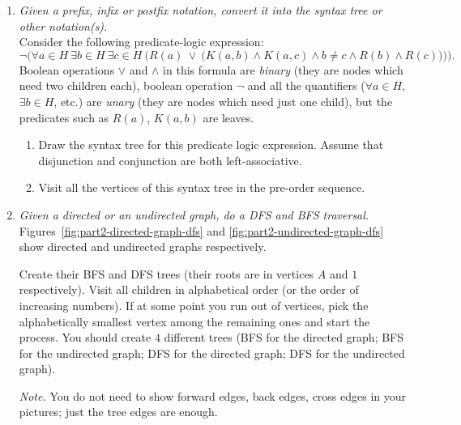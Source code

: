 \documentclass[a4paper,12pt]{article}
\begin{document}
\begin{enumerate}
\item {\small \em  Given a prefix, infix or postfix notation, convert it into the syntax tree or other notation(s).}\\
Consider the following predicate-logic expression:
\[ \neg \bigg( \forall a \in H\ \exists b \in H\ \exists c \in H\ \Big( R(a)\ \vee\  \big(K(a,b) \wedge K(a,c) \wedge b \neq c \wedge R(b) \wedge R(c)\big) \Big) \bigg). \]
Boolean operations $\vee$ and $\wedge$ in this formula are {\em binary} (they
are nodes which need two children each),
boolean operation $\neg$ and all the quantifiers ($\forall a \in H$, $\exists b \in H$, etc.) are {\em unary} (they are nodes which need just one child),
but the predicates such as $R(a)$, $K(a,b)$ are leaves.

\begin{enumerate}
\item Draw the syntax tree for this predicate logic expression. Assume that disjunction and conjunction are both left-associative.
\item Visit all the vertices of this syntax tree in the pre-order sequence.
\end{enumerate}


\item {\small \em  Given a directed or an undirected
graph, do a DFS and BFS traversal.}\\
Figures~\ref{fig:part2-directed-graph-dfs} and \ref{fig:part2-undirected-graph-dfs}
show directed and undirected graphs respectively.

Create their BFS and DFS trees (their roots are in vertices $A$ and $1$ respectively).
Visit all children in alphabetical order (or the order of increasing numbers).
If at some point you run out of vertices, pick the alphabetically smallest
vertex among the remaining ones and start the process.
You should create $4$ different trees (BFS for the directed graph;
BFS for the undirected graph; DFS for the directed graph; DFS for the undirected
graph).

{\em Note.} You do not need to show forward edges, back edges, cross edges in your
pictures; just the tree edges are enough.


\end{enumerate}
\end{document}
